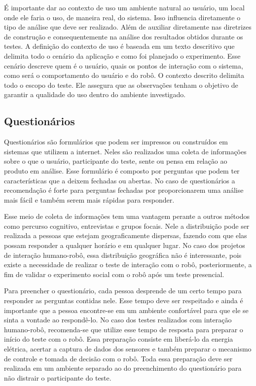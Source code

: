 É importante dar ao contexto de uso um ambiente natural ao usuário, um local onde ele faria o uso, de maneira real, do sistema. Isso influencia diretamente o tipo de análise que deve ser realizado. Além de auxiliar diretamente nas diretrizes de construção e consequentemente na análise dos resultados obtidos durante os testes. A definição do contexto de uso é baseada em um texto descritivo que delimita todo o cenário da aplicação e como foi planejado o experimento. Esse cenário descreve quem é o usuário, quais os pontos de interação com o sistema, como será o comportamento do usuário e do robô. O contexto descrito delimita todo o escopo do teste. Ele assegura que as observações tenham o objetivo de garantir a qualidade do uso dentro do ambiente investigado. 

\subsection{Questionários}
\label{sec:questionarios}
Questionários são formulários que podem ser impressos ou construídos em sistemas que utilizem a internet. Neles são realizados uma coleta de informações sobre o que o usuário, participante do teste, sente ou pensa em relação ao produto em análise. Esse formulário é composto por perguntas que podem ter características que a deixem fechadas ou abertas. No caso de questionários a recomendação é forte para perguntas fechadas por proporcionarem uma análise mais fácil e também serem mais rápidas para responder.

Esse meio de coleta de informações tem uma vantagem perante a outros métodos como percurso cognitivo, entrevistas e grupos focais. Nele a distribuição pode ser realizada a pessoas que estejam geograficamente dispersas, fazendo com que elas possam responder a qualquer horário e em qualquer lugar. No caso dos projetos de interação humano-robô, essa distribuição geográfica não é interessante, pois existe a necessidade de realizar o teste de interação com o robô, posteriormente, a fim de validar o experimento social com o robô após um teste presencial.

Para preencher o questionário, cada pessoa desprende de um certo tempo para responder as perguntas contidas nele. Esse tempo deve ser respeitado e ainda é importante que a pessoa encontre-se em um ambiente confortável para que ele se sinta a vontade ao respondê-lo. No caso dos testes realizados com interação humano-robô, recomenda-se que utilize esse tempo de resposta para preparar o início do teste com o robô. Essa preparação consiste em liberá-lo da energia elétrica, acertar a captura de dados dos sensores e também preparar o mecanismo de controle e tomada de decisão com o robô. Toda essa preparação deve ser realizada em um ambiente separado ao do preenchimento do questionário para não distrair o participante do teste.

